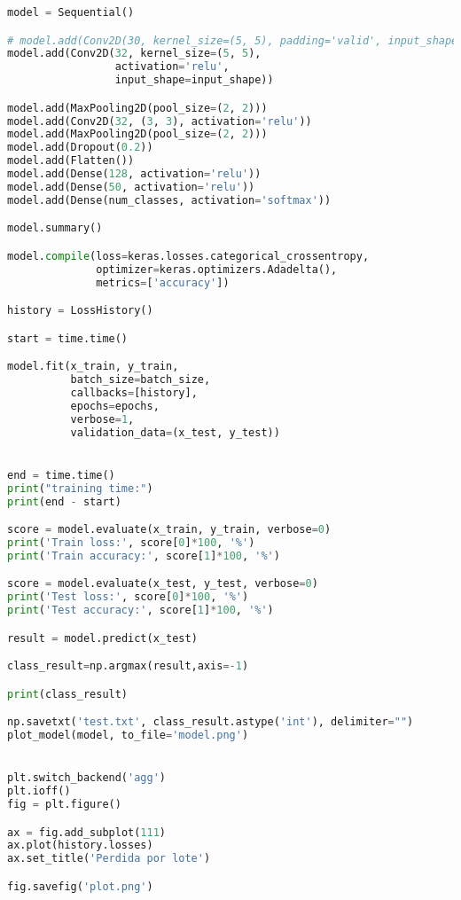 \begin{lstlisting}[language=python]
model = Sequential()

# model.add(Conv2D(30, kernel_size=(5, 5), padding='valid', input_shape=(1, 28, 28), activation='relu'))
model.add(Conv2D(32, kernel_size=(5, 5),
                 activation='relu',
                 input_shape=input_shape))

model.add(MaxPooling2D(pool_size=(2, 2)))
model.add(Conv2D(32, (3, 3), activation='relu'))
model.add(MaxPooling2D(pool_size=(2, 2)))
model.add(Dropout(0.2))
model.add(Flatten())
model.add(Dense(128, activation='relu'))
model.add(Dense(50, activation='relu'))
model.add(Dense(num_classes, activation='softmax'))

model.summary()

model.compile(loss=keras.losses.categorical_crossentropy,
              optimizer=keras.optimizers.Adadelta(),
              metrics=['accuracy'])

history = LossHistory()

start = time.time()

model.fit(x_train, y_train,
          batch_size=batch_size,
          callbacks=[history],
          epochs=epochs,
          verbose=1,
          validation_data=(x_test, y_test))


end = time.time()
print("training time:")
print(end - start)

score = model.evaluate(x_train, y_train, verbose=0)
print('Train loss:', score[0]*100, '%')
print('Train accuracy:', score[1]*100, '%')

score = model.evaluate(x_test, y_test, verbose=0)
print('Test loss:', score[0]*100, '%')
print('Test accuracy:', score[1]*100, '%')

result = model.predict(x_test)

class_result=np.argmax(result,axis=-1)

print(class_result)

np.savetxt('test.txt', class_result.astype('int'), delimiter="")
plot_model(model, to_file='model.png')


plt.switch_backend('agg')
plt.ioff()
fig = plt.figure()

ax = fig.add_subplot(111)
ax.plot(history.losses)
ax.set_title('Perdida por lote')

fig.savefig('plot.png')
\end{lstlisting}


